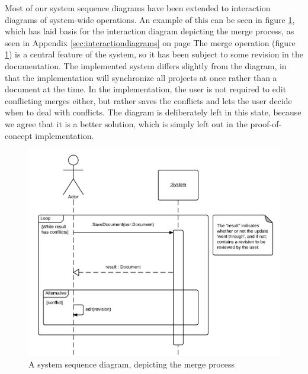 Most of our system sequence diagrams have been extended to interaction diagrams of system-wide operations. 
An example of this can be seen in figure \ref{fig:merge-ssd}, 
which has laid basis for the interaction diagram depicting the merge process, 
as seen in Appendix \ref{sec:interactiondiagrams} on page \pageref{fig:interaction-merge-diagram}
The merge operation (figure \ref{fig:merge-ssd}) is a central feature of the \SOP{} 
system, so it has been subject to some revision in the documentation.
The implemented system differs slightly from the diagram, in that the implementation will synchronize all projects at once rather than a document at the time. 
In the implementation, the user is not required to edit conflicting merges either, but rather 
saves the conflicts and lets the user decide when to deal with conflicts.
The diagram is deliberately left in this state, because we agree that it is a better solution, which is simply left out in the proof-of-concept \SOP{} implementation.

\begin{figure}[hbt]
	\centering
	\includegraphics[width=1\textwidth]{Software_analysis/graphics/Merge-ssd.png}
	\caption{A system sequence diagram, depicting the merge process}
	\label{fig:merge-ssd}
\end{figure}
